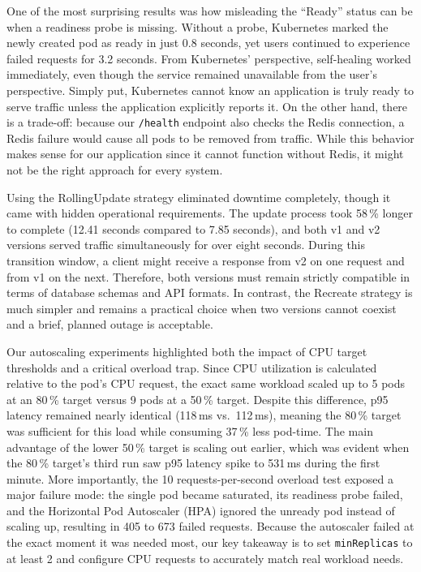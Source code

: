 \documentclass[conference,a4paper]{IEEEtran}
\begin{document}
One of the most surprising results was how misleading the ``Ready'' status can be when a readiness probe is missing. Without a probe, Kubernetes marked the newly created pod as ready in just 0.8 seconds, yet users continued to experience failed requests for 3.2 seconds. From Kubernetes' perspective, self-healing worked immediately, even though the service remained unavailable from the user's perspective. Simply put, Kubernetes cannot know an application is truly ready to serve traffic unless the application explicitly reports it. On the other hand, there is a trade-off: because our \texttt{/health} endpoint also checks the Redis connection, a Redis failure would cause all pods to be removed from traffic. While this behavior makes sense for our application since it cannot function without Redis, it might not be the right approach for every system.

Using the RollingUpdate strategy eliminated downtime completely, though it came with hidden operational requirements. The update process took 58\,\% longer to complete (12.41 seconds compared to 7.85 seconds), and both v1 and v2 versions served traffic simultaneously for over eight seconds. During this transition window, a client might receive a response from v2 on one request and from v1 on the next. Therefore, both versions must remain strictly compatible in terms of database schemas and API formats. In contrast, the Recreate strategy is much simpler and remains a practical choice when two versions cannot coexist and a brief, planned outage is acceptable.

Our autoscaling experiments highlighted both the impact of CPU target thresholds and a critical overload trap. Since CPU utilization is calculated relative to the pod's CPU request, the exact same workload scaled up to 5 pods at an 80\,\% target versus 9 pods at a 50\,\% target. Despite this difference, p95 latency remained nearly identical (118\,ms vs.\ 112\,ms), meaning the 80\,\% target was sufficient for this load while consuming 37\,\% less pod-time. The main advantage of the lower 50\,\% target is scaling out earlier, which was evident when the 80\,\% target's third run saw p95 latency spike to 531\,ms during the first minute. More importantly, the 10 requests-per-second overload test exposed a major failure mode: the single pod became saturated, its readiness probe failed, and the Horizontal Pod Autoscaler (HPA) ignored the unready pod instead of scaling up, resulting in 405 to 673 failed requests. Because the autoscaler failed at the exact moment it was needed most, our key takeaway is to set \texttt{minReplicas} to at least 2 and configure CPU requests to accurately match real workload needs.
\end{document}
